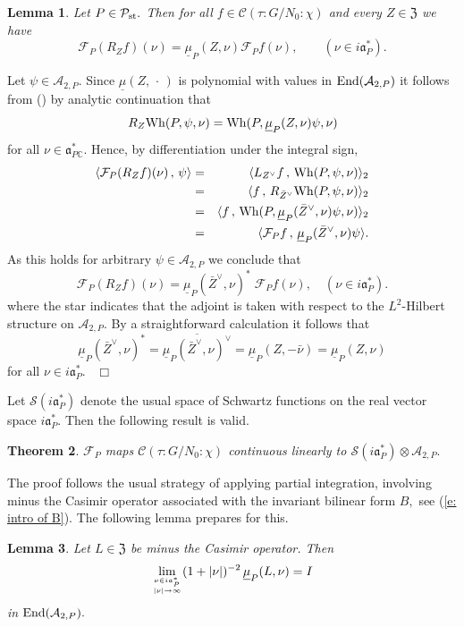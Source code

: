 \documentclass[12pt,a4paper]{article}
\newtheorem{Thm}{Theorem}
\newtheorem{Lemma}[Thm]{Lemma}
\newenvironment{thm}[0]{\begin{Thm}\noindent}%
{\end{Thm}}
\newenvironment{lemma}[0]{\begin{Lemma}\noindent}%
{\end{Lemma}}
\def\proof{\par\noindent{\it Proof.}{\ }{\ }}
\def\qed{~\hfill\hbox{$\Box$}\medbreak}
\def\qquad{\quad\quad}
\def\msy#1{{\mathbb #1}}
\def\C{{\msy C}}
\def\got#1{\mathfrak #1}
\def\fa{{\got a}}
\def\to{\rightarrow}
\def\inp#1#2{\langle#1\,,\,#2\rangle}
\def\End{{\rm End}}
\def\iC{{\scriptscriptstyle \C}}
\def\cA{{\mathcal A}}
\def\cC{{\mathcal C}}
\def\cF{{\mathcal F}}
\def\cP{{\mathcal P}}
\def\cS{{\mathcal S}}
\numberwithin{Thm}{section}
\numberwithin{equation}{section}
\def\dotvar{\, \cdot\,}
\def\fZ{{\mathfrak Z}}
\def\Wh{{\rm Wh}}
\def\faPdc{{\fa_{P\iC}^*}}
\def\faPd{{\fa_P^*}}
\numberwithin{equation}{section}
\def\fZ{{\mathfrak Z}}
\def\faPdc{\fa_{P\iC}^*}
\def\cAtwoP{\cA_{2,P}}
\def\topping#1#2{\genfrac{}{}{0pt}{}{#1}{#2}}
\def\col{\!:\!}
\def\umu{\underline{\mu}}
\def\cPst{\cP_{\rm st}}
\def\cchi{\chi}
\def\veec{\vee}%
\begin{document}
\begin{lemma}
\label{l: Fourier Z f}
Let $P \in \cPst.$ Then for all $f \in \cC(\tau : G/N_0\col \cchi)$ 
and every $Z \in\fZ$ we have
$$ 
\cF_P (R_Z f)(\nu)  = \umu_P(Z, \nu ) \cF_Pf(\nu), \qquad (\nu \in i\faPd).
$$%
\end{lemma}

\proof Let $\psi \in \cAtwoP.$ 
Since $\umu(Z, \dotvar)$ is polynomial with values in $\End(\cAtwoP)$ 
it follows from () by analytic continuation that 
$$
R_Z \Wh(P, \psi, \nu) = \Wh(P, \umu_P(Z, \nu) \psi, \nu)
$$%
for all $\nu \in \faPdc.$  Hence, by differentiation under the integral sign,
\begin{eqnarray*}
\inp{\cF_P( R_Z f)(\nu)}{ \psi} &=& \inp{L_{Z^\veec} f}{\Wh(P, \psi, \nu)}_2\\
&=& 
\inp{f}{R_{\bar Z^\veec} \Wh(P, \psi, \nu) }_2\\
&=& 
\inp{f}{\Wh(P, \umu_P(\bar Z^\veec, \nu)  \psi, \nu)}_2\\
&=& 
\inp{\cF_P f}{ \umu_P(\bar Z^\veec, \nu)  \psi}.
\end{eqnarray*}
As this holds for arbitrary $\psi \in \cAtwoP$ we conclude that 
$$ 
\cF_P (R_Z f)(\nu) = \umu_P(\bar Z^\veec, \nu)^*\; \cF_P f(\nu) ,\quad (\nu \in i\faPd).
$$%
where the star indicates that the adjoint is taken with  respect to the $L^2$-Hilbert structure on $\cAtwoP.$ By a straightforward calculation it follows that
$$ 
\umu_P(\bar Z^\veec, \nu)^* = \overline{\umu_P(\bar Z^\veec, \nu)^\veec} =
\umu_P(Z, -\bar \nu ) = \umu_P(Z, \nu )
$$%
for all $\nu \in i \faPd.$ 
\qed

Let $\cS(i\faPd)$ denote the usual space of Schwartz functions on the real vector space $i\faPd.$ 
Then the following result is valid.

\begin{thm}
\label{t: Fourier continuous into Schwartz}
$\cF_P$ maps  $\cC(\tau \!:\!G/N_0\col \cchi)$ continuous linearly to 
$\cS(i\faPd)\otimes \cAtwoP.$ 
\end{thm}

The proof follows the usual strategy of applying partial integration,
involving minus the Casimir operator associated with the invariant bilinear form 
$B,$ see (\ref{e: intro of B}).
The following lemma prepares for this.
\begin{lemma}
\label{l: limit umu L}
 Let $L \in \fZ$ be minus the Casimir operator. Then 
$$ 
\lim_{\topping{\nu \in i\faPd}{ |\nu| \to \infty}} (1 + |\nu|)^{-2} \, \umu_P(L, \nu) = I
$$%
in $\End(\cAtwoP).$ 
\end{lemma}
\end{document}
